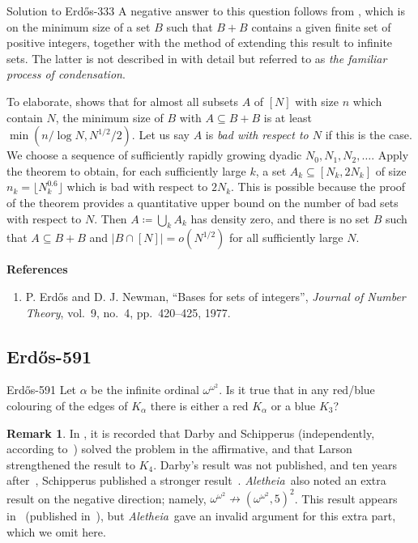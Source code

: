 \documentclass{article}
\theoremstyle{plain}
\theoremstyle{definition}
\newtheorem{remark}{Remark}[section]
\newcommand{\Aletheia}{\emph{Aletheia}}
\begin{document}
\begin{solution}{Solution to {Erdős-333}}
A negative answer to this question follows from \cite[Theorem 2]{EN77}, which is on the minimum size of a set \(B\) such that \(B+B\) contains a given finite set of positive integers, together with the method of extending this result to infinite sets. The latter is not described in \cite{EN77} with detail but referred to as \emph{the familiar process of condensation}.

To elaborate, \cite[Theorem 2]{EN77} shows that for almost all subsets $A$ of $[N]$ with size $n$ which contain \(N\), the minimum size of $B$ with $A \subseteq B + B$ is at least $\min(n/\log N, N^{1/2} / 2)$. Let us say $A$ is \emph{bad with respect to $N$} if this is the case. We choose a sequence of sufficiently rapidly growing dyadic $N_0, N_1, N_2, \dots$. Apply the theorem to obtain, for each sufficiently large \(k\), a set $A_k \subseteq [N_k, 2N_k]$ of size $n_k = \lfloor N_k^{0.6} \rfloor$ which is bad with respect to $2N_k$. This is possible because the proof of the theorem provides a quantitative upper bound on the number of bad sets with respect to \(N\). Then $A \coloneqq \bigcup_k A_k$ has density zero, and there is no set \(B\) such that \(A\subseteq B+B\) and \(|B\cap[N]|=o(N^{1/2})\) for all sufficiently large \(N\).

\medskip
\textbf{References}\begin{enumerate} \item \cite{EN77} P. Erdős and D. J. Newman, ``Bases for sets of integers'', \textit{Journal of Number Theory}, vol.~9, no.~4, pp.~420--425, 1977.
\end{enumerate}
\end{solution}



\subsection{Erdős-591}

\begin{problem}{Erdős-591 \cite{Er82e, Er87}}
    Let $\alpha$ be the infinite ordinal $\omega^{\omega^2}$. Is it true that in any red/blue colouring of the edges of $K_\alpha$ there is either a red $K_\alpha$ or a blue $K_3$?
\end{problem}

\begin{remark} In \cite[Theorem 6.2]{darby99}, it is recorded that Darby and Schipperus (independently, according to~\cite{HajLar10}) solved the problem in the affirmative, and that Larson strengthened the result to $K_4$. Darby's result was not published, and ten years after~\cite{darby99}, Schipperus published a stronger result~\cite{Sch10}. \Aletheia~also noted an extra result on the negative direction; namely, $ \omega^{\omega^2} \not\to (\omega^{\omega^2}, 5)^2 $. This result  appears in~\cite{darby99} (published in~\cite{Larson00}), but \Aletheia~gave an invalid argument for this extra part, which we omit here.
\end{remark}
\end{document}

